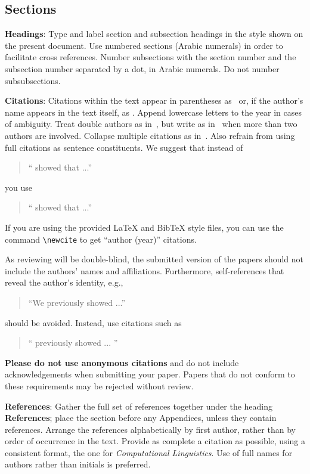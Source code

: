 \documentclass[11pt]{article}
\begin{document}
\subsection{Sections}

{\bf Headings}: Type and label section and subsection headings in the
style shown on the present document.  Use numbered sections (Arabic
numerals) in order to facilitate cross references. Number subsections
with the section number and the subsection number separated by a dot,
in Arabic numerals. Do not number subsubsections.

{\bf Citations}: Citations within the text appear
in parentheses as~\cite{vaswani2017attention} or, if the author's name appears in
the text itself, as . 
Append lowercase letters to the year in cases of ambiguity.  
Treat double authors as in~\cite{Aho:72}, but write as
 in~\cite{Chandra:81} when more than two authors are involved. Collapse multiple citations as
in~\cite{Gusfield:97,Aho:72}. Also refrain from using full citations as sentence constituents. We
suggest that instead of
\begin{quote}
  ``\cite{vaswani2017attention} showed that ...''
\end{quote}
you use
\begin{quote}
`` showed that ...''
\end{quote}

If you are using the provided \LaTeX{} and Bib\TeX{} style files, you
can use the command \verb|\newcite| to get ``author (year)'' citations.

As reviewing will be double-blind, the submitted version of the papers should not include the
authors' names and affiliations. Furthermore, self-references that
reveal the author's identity, e.g.,
\begin{quote}
``We previously showed \cite{vaswani2017attention} ...''  
\end{quote}
should be avoided. Instead, use citations such as 
\begin{quote}
``
previously showed ... ''
\end{quote}

\textbf{Please do not  use anonymous citations} and  do not include acknowledgements when submitting your paper. Papers that do not conform
to these requirements may be rejected without review. 

\textbf{References}: Gather the full set of references together under
the heading {\bf References}; place the section before any Appendices,
unless they contain references. Arrange the references alphabetically
by first author, rather than by order of occurrence in the text.
Provide as complete a citation as possible, using a consistent format,
 the one for {\em Computational Linguistics\/}.  Use of full names for
authors rather than initials is preferred. 
\end{document}
